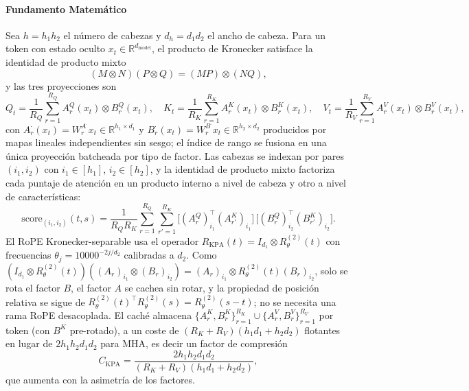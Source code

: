 \paragraph{Fundamento Matemático}
Sea $h = h_1 h_2$ el número de cabezas y $d_h = d_1 d_2$ el ancho de cabeza. Para un token con estado oculto $x_t \in \mathbb{R}^{d_{\text{model}}}$, el producto de Kronecker satisface la identidad de producto mixto
\[
(M \otimes N)(P \otimes Q) = (MP) \otimes (NQ),
\]
y las tres proyecciones son
\[
Q_t = \frac{1}{R_Q}\sum_{r=1}^{R_Q} A^Q_r(x_t)\otimes B^Q_r(x_t),\quad
K_t = \frac{1}{R_K}\sum_{r=1}^{R_K} A^K_r(x_t)\otimes B^K_r(x_t),\quad
V_t = \frac{1}{R_V}\sum_{r=1}^{R_V} A^V_r(x_t)\otimes B^V_r(x_t),
\]
con $A^\cdot_r(x_t) = W^{A^\cdot}_r x_t \in \mathbb{R}^{h_1\times d_1}$ y $B^\cdot_r(x_t) = W^{B^\cdot}_r x_t \in \mathbb{R}^{h_2\times d_2}$ producidos por mapas lineales independientes sin sesgo; el índice de rango se fusiona en una única proyección batcheada por tipo de factor. Las cabezas se indexan por pares $(i_1,i_2)$ con $i_1\in[h_1]$, $i_2\in[h_2]$, y la identidad de producto mixto factoriza cada puntaje de atención en un producto interno a nivel de cabeza y otro a nivel de características:
\[
\mathrm{score}_{(i_1,i_2)}(t,s) = \frac{1}{R_Q R_K}\sum_{r=1}^{R_Q}\sum_{r'=1}^{R_K}
\bigl[(A^Q_r)_{i_1}^{\top}(A^K_{r'})_{i_1}\bigr]\,
\bigl[(B^Q_r)_{i_2}^{\top}(B^K_{r'})_{i_2}\bigr].
\]
El RoPE Kronecker-separable usa el operador $R_{\mathrm{KPA}}(t) = I_{d_1}\otimes R^{(2)}_\theta(t)$ con frecuencias $\theta_j = 10000^{-2j/d_2}$ calibradas a $d_2$. Como $(I_{d_1}\otimes R^{(2)}_\theta(t))((A_r)_{i_1}\otimes(B_r)_{i_2}) = (A_r)_{i_1}\otimes R^{(2)}_\theta(t)(B_r)_{i_2}$, solo se rota el factor $B$, el factor $A$ se cachea sin rotar, y la propiedad de posición relativa se sigue de $R^{(2)}_\theta(t)^{\top}R^{(2)}_\theta(s) = R^{(2)}_\theta(s-t)$; no se necesita una rama RoPE desacoplada.
El caché almacena $\{A^K_r, B^K_r\}_{r=1}^{R_K}\cup\{A^V_r, B^V_r\}_{r=1}^{R_V}$ por token (con $B^K$ pre-rotado), a un coste de $(R_K+R_V)(h_1d_1+h_2d_2)$ flotantes en lugar de $2h_1h_2d_1d_2$ para MHA, es decir un factor de compresión
\[
C_{\mathrm{KPA}} = \frac{2h_1h_2d_1d_2}{(R_K+R_V)(h_1d_1+h_2d_2)},
\]
que aumenta con la asimetría de los factores.

